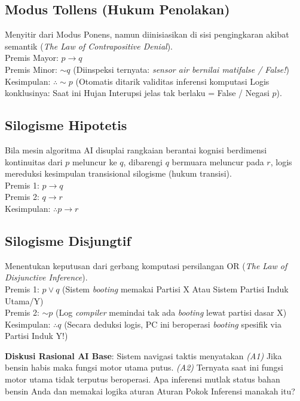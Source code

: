 \documentclass[../main.tex]{subfiles}
\begin{document}
\subsection{Modus Tollens (Hukum Penolakan)}
Menyitir dari Modus Ponens, namun diinisiasikan di sisi pengingkaran akibat semantik (\textit{The Law of Contrapositive Denial}). \\
Premis Mayor: $p \rightarrow q$ \\
Premis Minor: $\sim q$ (Diinspeksi ternyata: \textit{sensor air bernilai matifalse / False!}) \\
Kesimpulan: $\therefore \sim p$ (Otomatis ditarik validitas inferensi komputasi Logis konklusinya: Saat ini Hujan Interupsi jelas tak berlaku = False / Negasi $p$).

\subsection{Silogisme Hipotetis}
Bila mesin algoritma AI disuplai rangkaian berantai kognisi berdimensi kontinuitas dari $p$ meluncur ke $q$, dibarengi $q$ bermuara meluncur pada $r$, logis mereduksi kesimpulan transisional silogisme (hukum transisi).\\
Premis 1: $p \rightarrow q$ \\
Premis 2: $q \rightarrow r$ \\
Kesimpulan: $\therefore p \rightarrow r$

\subsection{Silogisme Disjungtif}
Menentukan keputusan dari gerbang komputasi persilangan OR (\textit{The Law of Disjunctive Inference}).\\
Premis 1: $p \lor q$ (Sistem \textit{booting} memakai Partisi X Atau Sistem Partisi Induk Utama/Y)\\
Premis 2: $\sim p$ (Log \textit{compiler} memindai tak ada \textit{booting} lewat partisi dasar X)\\
Kesimpulan: $\therefore q$ (Secara deduksi logis, PC ini beroperasi \textit{booting} spesifik via Partisi Induk Y!)

\begin{aktivitas}
  \item \textbf{Diskusi Rasional AI Base}: Sistem navigasi taktis menyatakan \textit{(A1)} Jika bensin habis maka fungsi motor utama putus. \textit{(A2)} Ternyata saat ini fungsi motor utama tidak terputus beroperasi. Apa inferensi mutlak status bahan bensin Anda dan memakai logika aturan Aturan Pokok Inferensi manakah itu?
\end{aktivitas}
\end{document}
